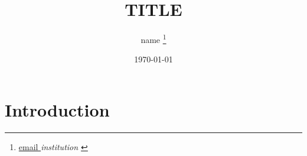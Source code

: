 \documentclass[a4paper,draft]{article}
\title{TITLE}
\author{ {{ name }}%
    \thanks{\href{mailto: {{ email }} }{ {{ email }} } \newline \textit{ {{ institution }} }%
        }
    }
\date{\today}
\begin{document}
\maketitle

\section{Introduction}
\label{sec:introduction}



\end{document}
